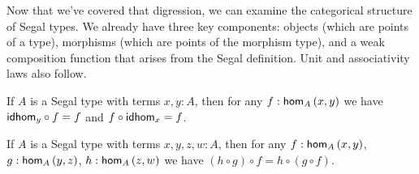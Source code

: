 \documentclass[main.tex]{subfiles}
\begin{document}
Now that we've covered that digression, we can examine the categorical structure of Segal types. We already have three key components: objects (which are points of a type), morphisms (which are points of the morphism type), and a weak composition function that arises from the Segal definition. Unit and associativity laws also follow.

\begin{lemma}
    If $A$ is a Segal type with terms $x,y : A$, then for any $f : \ho[A]{x}{y}$ we have $\idhom{y}\circ f = f$ and $f \circ \idhom{x} = f$.
\end{lemma}

\begin{lemma}
    If $A$ is a Segal type with terms $x,y,z,w : A$, then for any $f : \ho[A]{x}{y}$, $g : \ho[A]{y}{z}$, $h : \ho[A]{z}{w}$ we have $(h \circ g )  \circ f = h \circ (g \circ f).$
\end{lemma}
\end{document}
